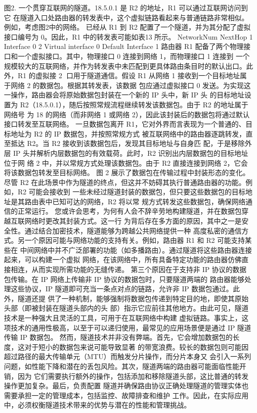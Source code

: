        图2. 一个贯穿互联网的隧道。18.5.0.1 是 R2 的地址，R1 可以通过互联网访问到它
在隧道入口处路由器的转发表中，这个虚拟链路看起来与普通链路非常相似。例如，考虑图2中的网络。
已经从 R1 到 R2 配置了一个隧道，并为其分配了虚拟接口编号为 0。因此，R1 中的转发表可能如表13
所示。
NetworkNum                     NextHop
1                              Interface 0
2                              Virtual interface 0
Default                        Interface 1
路由器 R1 配备了两个物理接口和一个虚拟接口。其中，物理接口 0 连接到网络 1，而物理接口 1 连接到
一个规模较大的互联网络，并作为转发表中未匹配到更具体路由条目时的默认出口。此外，R1 的虚拟接
                                                         2
口用于隧道通信。假设 R1 从网络 1 接收到一个目标地址属于网络 2 的数据包。根据其转发表，该数据
包应通过虚拟接口 0 发送。为实现这一操作，路由器会将原始数据包封装在一个新的 IP 头中，新 IP 头
的目标地址设置为 R2（18.5.0.1），随后按照常规流程继续转发该数据包。由于 R2 的地址属于网络号
为 18 的网络（而非网络 1 或网络 2），因此该封装后的数据包将通过默认接口转发至互联网络。
一旦数据包离开 R1，它对外界而言表现为一个普通的、目标地址为 R2 的 IP 数据包，并按照常规方式
被互联网络中的路由器逐跳转发，直至抵达 R2。当 R2 接收到该数据包后，发现其目标地址与自身匹
配，于是移除外层 IP 头并解析内层数据包的有效载荷。此时，R2 识别出内层数据包的目标地址位于网
络 2 中，并以常规方式处理该数据包。由于 R2 直接连接到网络 2，它会将该数据包转发至目标网络。
图 2 展示了数据包在传输过程中封装形态的变化。
尽管 R2 在此场景中作为隧道的终点，但这并不妨碍其执行普通路由器的功能。例如，R2 可能会接收到
一些未经过隧道封装的数据包，但只要这些数据包的目标地址是其路由表中已知可达的网络，R2 将以常
规方式转发这些数据包，确保网络通信的正常运行。
您或许会思考，为何有人会不辞辛劳地构建隧道，并在数据包穿越互联网络时更改其封装方式。这一行
为背后存在多方面的原因，其中之一是安全性。通过结合加密技术，隧道能够为跨越公共网络提供一种
高度私密的通信方式。另一个原因可能与网络功能的支持有关。例如，路由器 R1 和 R2 可能支持某些在
中间网络中并不广泛部署的功能（如多播路由）。通过隧道将这些路由器连接起来，可以构建一个虚拟
网络，在该网络中，所有具备特定功能的路由器仿佛直接相连，从而实现所需功能的无缝传递。
第三个原因在于支持非 IP 协议的数据包传输。在 IP 网络上传输非 IP 协议的数据包时，只要隧道两端的
路由器能够处理这些协议，IP 隧道即可充当一条点对点的链路，允许非 IP 数据包通过。此外，隧道还提
供了一种机制，能够强制将数据包传递到特定目的地，即使其原始头部（即被封装在隧道头部内的头
部）指示它应前往其他地方。由此可见，隧道技术是一种强大且灵活的工具，可用于在互联网络中构建
虚拟链路。事实上，这项技术的通用性极高，以至于可以递归使用，最常见的应用场景便是通过 IP 隧道
传输 IP 数据包。
然而，隧道技术并非没有弊端。首先，它会增加数据包的长度，这对于短小的数据包来说可能导致显著
的带宽浪费。较长的数据包则可能因超过路径的最大传输单元（MTU）而触发分片操作，而分片本身又
会引入一系列问题，如性能下降和潜在的丢包风险。其次，隧道两端的路由器可能面临性能开销，因为
它们需要执行额外的操作，包括添加和移除隧道头部，这比普通的转发操作更加复杂。最后，负责配置
隧道并确保路由协议正确处理隧道的管理实体也需要承担一定的管理成本，包括监控、故障排查和维护
工作。因此，在实际应用中，必须权衡隧道技术带来的优势与潜在的性能和管理挑战。




